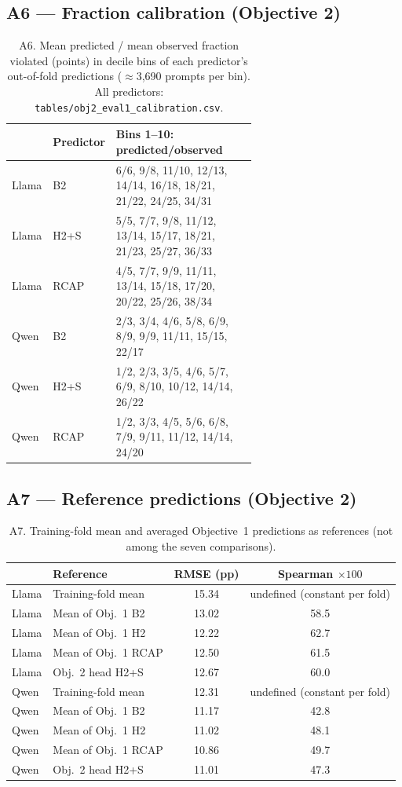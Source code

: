 \subsection*{A6 --- Fraction calibration (Objective 2)}
\begin{table}[h]
\centering\scriptsize
\caption{A6. Mean predicted / mean observed fraction violated (points) in decile bins of each predictor's out-of-fold predictions ($\approx$3,690 prompts per bin). All predictors: \texttt{tables/obj2\_eval1\_calibration.csv}.}
\label{tab:A6}
\begin{tabular}{llp{0.62\linewidth}}
\toprule
 & Predictor & Bins 1--10: predicted/observed \\
\midrule
Llama & B2 & 6/6, 9/8, 11/10, 12/13, 14/14, 16/18, 18/21, 21/22, 24/25, 34/31 \\
Llama & H2+S & 5/5, 7/7, 9/8, 11/12, 13/14, 15/17, 18/21, 21/23, 25/27, 36/33 \\
Llama & RCAP & 4/5, 7/7, 9/9, 11/11, 13/14, 15/18, 17/20, 20/22, 25/26, 38/34 \\
Qwen & B2 & 2/3, 3/4, 4/6, 5/8, 6/9, 8/9, 9/9, 11/11, 15/15, 22/17 \\
Qwen & H2+S & 1/2, 2/3, 3/5, 4/6, 5/7, 6/9, 8/10, 10/12, 14/14, 26/22 \\
Qwen & RCAP & 1/2, 3/3, 4/5, 5/6, 6/8, 7/9, 9/11, 11/12, 14/14, 24/20 \\
\bottomrule
\end{tabular}
\end{table}

\subsection*{A7 --- Reference predictions (Objective 2)}
\begin{table}[h]
\centering\scriptsize
\caption{A7. Training-fold mean and averaged Objective~1 predictions as references (not among the seven comparisons).}
\label{tab:A7}
\begin{tabular}{llcc}
\toprule
 & Reference & RMSE (pp) & Spearman $\times100$ \\
\midrule
Llama & Training-fold mean & 15.34 & undefined (constant per fold) \\
Llama & Mean of Obj.~1 B2 & 13.02 & 58.5 \\
Llama & Mean of Obj.~1 H2 & 12.22 & 62.7 \\
Llama & Mean of Obj.~1 RCAP & 12.50 & 61.5 \\
Llama & Obj.~2 head H2+S & 12.67 & 60.0 \\
\midrule
Qwen & Training-fold mean & 12.31 & undefined (constant per fold) \\
Qwen & Mean of Obj.~1 B2 & 11.17 & 42.8 \\
Qwen & Mean of Obj.~1 H2 & 11.02 & 48.1 \\
Qwen & Mean of Obj.~1 RCAP & 10.86 & 49.7 \\
Qwen & Obj.~2 head H2+S & 11.01 & 47.3 \\
\bottomrule
\end{tabular}
\end{table}


